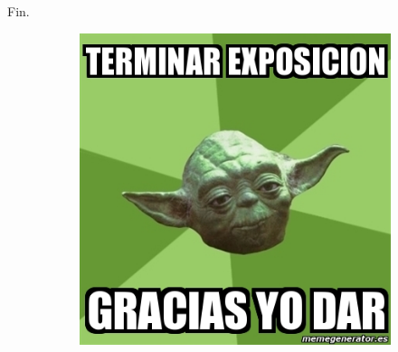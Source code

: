 
\begin{frame}[fragile]{Fin.}{}
  \begin{figure}
    \centering
    \begin{subfigure}[b]{0.6\textwidth}
      \includegraphics[width=\textwidth]{./Imagenes/Agradecimientos.jpg}
    \end{subfigure}
  \end{figure}
\end{frame}
